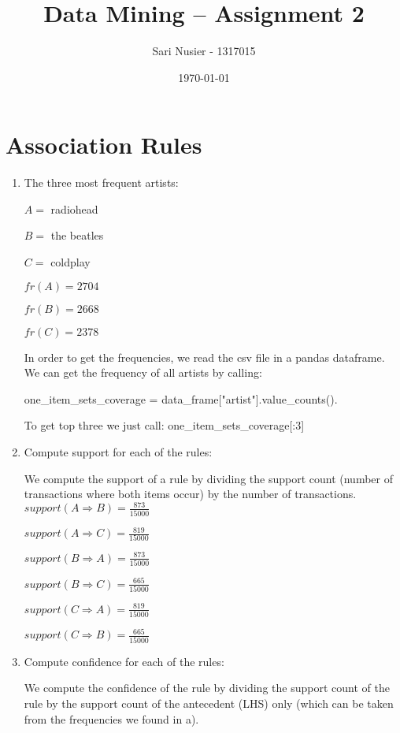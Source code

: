 \documentclass[12pt,a4paper]{article}
\begin{document}
\begin{titlepage}
	\centering
	\title{Data Mining -- Assignment 2}
	\author{Sari Nusier - 1317015}
	\date{\today}
	\maketitle
\end{titlepage}


\section{Association Rules}
	\begin{enumerate}[label=(\alph*)]
		\item The three most frequent artists:
		
		$A = $ radiohead
		
		$B = $ the beatles
		
		$C = $ coldplay
		
		$fr(A) = 2704$
		
		$fr(B) = 2668$
		
		$fr(C) = 2378$
		
		In order to get the frequencies, we read the csv file in a pandas dataframe. We can get the frequency of all artists by calling: 
		
		one\_item\_sets\_coverage = data\_frame["artist"].value\_counts(). 
		
		To get top three we just call: one\_item\_sets\_coverage[:3]
		
		\item Compute support for each of the rules:
		
			We compute the support of a rule by dividing the support count (number of transactions where both items occur) by the number of transactions.
			$support(A \Rightarrow B) = \frac{873}{15000}$
			
			$support(A \Rightarrow C) = \frac{819}{15000}$
			
			$support(B \Rightarrow A) = \frac{873}{15000}$
			
			$support(B \Rightarrow C) = \frac{665}{15000}$
			
			$support(C \Rightarrow A) = \frac{819}{15000}$
			
			$support(C \Rightarrow B) = \frac{665}{15000}$
		\item Compute confidence for each of the rules:
					
			We compute the confidence of the rule by dividing the support count of the rule by the support count of the antecedent (LHS) only (which can be taken from the frequencies we found in a).		
			

\end{enumerate}
\end{document}
